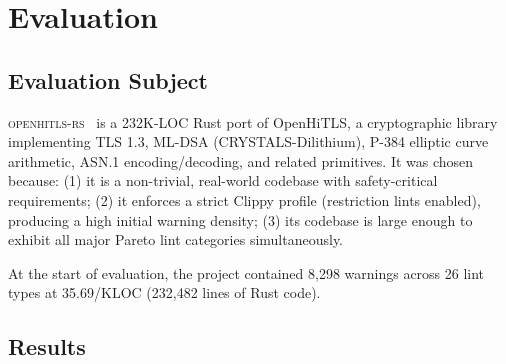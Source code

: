 \documentclass[sigconf,review,anonymous]{acmart}
\begin{document}
\section{Evaluation}\label{sec:eval}

\subsection{Evaluation Subject}

\textsc{openhitls-rs}~\cite{openhitls} is a 232K-LOC Rust port of OpenHiTLS,
a cryptographic library implementing TLS 1.3, ML-DSA (CRYSTALS-Dilithium),
P-384 elliptic curve arithmetic, ASN.1 encoding/decoding, and related
primitives.
It was chosen because:
(1) it is a non-trivial, real-world codebase with safety-critical requirements;
(2) it enforces a strict Clippy profile (restriction lints enabled), producing
a high initial warning density;
(3) its codebase is large enough to exhibit all major Pareto lint categories
simultaneously.

At the start of evaluation, the project contained 8,298 warnings across
26 lint types at 35.69/KLOC (232,482 lines of Rust code).

\subsection{Results}
\end{document}
